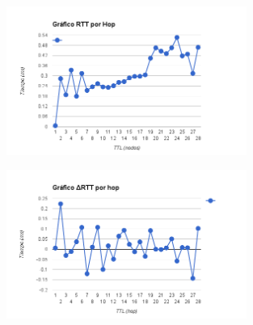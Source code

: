 \begin{figure}[h]
    \includegraphics[width=0.7\textwidth]{img_analisis1/rtt_hop.png}
    
\end{figure}
\vspace{0.25cm}

\begin{figure}[h]
    \includegraphics[width=0.7\textwidth]{img_analisis1/delta_rtt_hop.png}
    
\end{figure}
\vspace{0.25cm}

